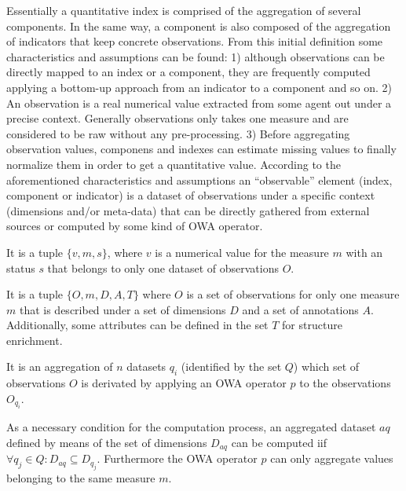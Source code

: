 Essentially a quantitative index is comprised of the aggregation of several components. In the same way, 
a component is also composed of the aggregation of indicators that keep concrete observations. From this initial definition 
some characteristics and assumptions can be found: 1) although observations can be directly mapped to an index or a component, they 
are frequently computed applying a bottom-up approach from an indicator to a component and so on. 2) An observation is 
a real numerical value extracted from some agent out under a precise context. Generally observations only takes one measure and are considered 
to be raw without any pre-processing. 3) Before aggregating observation values, componens and indexes can 
estimate missing values to finally normalize them in order to get a quantitative value. According to the aforementioned characteristics and assumptions an ``observable'' element (index, component or indicator) is a 
dataset of observations under a specific context (dimensions and/or meta-data) that can be directly gathered from external 
sources or computed by some kind of OWA operator. 

\begin{definition}[Observation-$o$]\upshape
It is a tuple $\{v,m,s\}$, where $v$ is a numerical value for the measure $m$ with an status $s$ that belongs to 
only one dataset of observations $O$. 
\end{definition}


\begin{definition}[Dataset-$q$]\upshape
It is a tuple $\{O,m,D,A,T\}$ where $O$ is a set of observations for only one measure $m$ that is described under 
a set of dimensions $D$ and a set of annotations $A$. Additionally, some attributes can be defined in the set $T$ for structure enrichment. 
\end{definition}


\begin{definition}\upshape
It is an aggregation of $n$ datasets $q_i$ (identified by the set $Q$) which set of observations $O$ is derivated by applying 
an OWA operator $p$ to the observations $O_{q_i}$. 
\end{definition}

As a necessary condition for the computation process, an aggregated dataset $aq$ defined by means of the set of dimensions $D_{aq}$ can be computed iif 
$\forall q_j \in Q: D_{aq} \subseteq D_{q_j}$. Furthermore the OWA operator $p$ can only aggregate values belonging to the same measure $m$.


